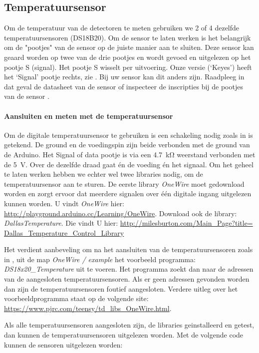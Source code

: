 \subsection{Temperatuursensor}

Om de temperatuur van de detectoren te meten gebruiken we 2 of 4
dezelfde temperatuursensoren (DS18B20). Om de sensor te laten werken is
het belangrijk om de "pootjes" van de sensor op de juiste manier aan te
sluiten. Deze sensor kan geaard worden op twee van de drie pootjes en
wordt gevoed en uitgelezen op het pootje S (signal). Het pootje S
wisselt per uitvoering. Onze versie (`Keyes') heeft het `Signal' pootje
rechts,  zie . Bij uw sensor kan dit anders zijn.
Raadpleeg in dat geval de datasheet van de sensor of inspecteer de
inscripties bij de pootjes van de sensor .

\paragraph{Aansluiten en meten met de temperatuursensor}

Om de digitale temperatuursensor te gebruiken is een schakeling nodig
zoals in  is getekend. De ground en de
voedingspin zijn beide verbonden met de ground van de Arduino. Het
Signal of data pootje is via een \SI{4.7}{\kilo\ohm} weerstand verbonden
met de \SI{5}{\volt}. Over de dezelfde draad gaat én de voeding én het
signaal. Om het geheel te laten werken hebben we echter wel twee
libraries nodig, om de temperatuursensor aan te sturen. De eerste
library \emph{OneWire} moet gedownload worden en zorgt ervoor dat
meerdere signalen over één digitale ingang uitgelezen kunnen worden. U
vindt \emph{OneWire} hier:
\url{http://playground.arduino.cc/Learning/OneWire}. Download ook de
library: \emph{DallasTemperature}. Die vindt U hier:
\url{http://milesburton.com/Main_Page?title=
Dallas_Temperature_Control_Library}

Het verdient aanbeveling om na het aansluiten van de temperatuursensoren
zoals in , uit de map \emph{OneWire /
example} het voorbeeld programma: \emph{DS18x20\_Temperature} uit te
voeren. Het programma zoekt dan naar de adressen van de aangesloten
temperatuursensoren. Als er geen adressen gevonden worden dan zijn de
temperatuursensoren foutief aangesloten. Verdere uitleg over het
voorbeeldprogramma staat op de volgende site:
\url{https://www.pjrc.com/teensy/td_libs_OneWire.html}.

Als alle temperatuursensoren aangesloten zijn, de libraries
geinstalleerd en getest, dan kunnen de temperatuursensoren
uitgelezen worden. Met de volgende code kunnen de sensoren uitgelezen
worden:


